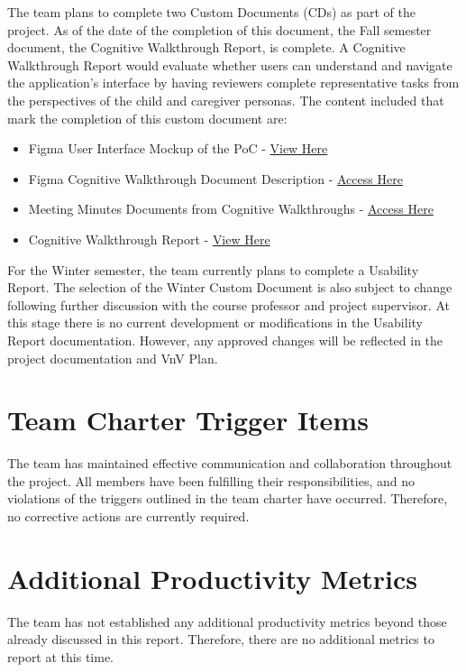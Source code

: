 \documentclass[10pt, titlepage]{article}
\begin{document}
The team plans to complete two Custom Documents (CDs) as part of the \progname{} project. As of the date of the completion 
of this document, the Fall semester document, the Cognitive Walkthrough Report, is complete. A Cognitive Walkthrough Report 
would evaluate whether users can understand and navigate the application's interface by having reviewers complete representative 
tasks from the perspectives of the child and caregiver personas. The content included that mark the completion of this custom 
document are:
\begin{itemize}
    \item Figma User Interface Mockup of the PoC - \href{https://www.figma.com/proto/IBdPBjcaoQjUY02BwWSvpv/EyeCanDo-Cognitive-Walkthrough?node-id=7-2&t=RJp70Vsrg4hKMli7-1&scaling=scale-down&content-scaling=fixed&page-id=0%3A1&starting-point-node-id=7%3A2}{View Here}
    \item Figma Cognitive Walkthrough Document Description - \href{https://github.com/team-hindsight/ophthamology-game/blob/main/docs/CDs/CognitiveWalkthrough/Figma/Figma.md}{Access Here}
    \item Meeting Minutes Documents from Cognitive Walkthroughs - \href{https://github.com/team-hindsight/ophthamology-game/tree/main/docs/CDs/CognitiveWalkthrough/MeetingNotes}{Access Here}
    \item Cognitive Walkthrough Report - \href{https://team-hindsight.github.io/ophthamology-game/CDs/CognitiveWalkthrough/CognitiveWalkthrough.pdf}{View Here}
\end{itemize}

For the Winter semester, the team currently plans to complete a Usability Report. The selection of the Winter 
Custom Document is also subject to change following further discussion with the course professor and project supervisor. 
At this stage there is no current development or modifications in the Usability Report documentation. However, any approved 
changes will be reflected in the project documentation and VnV Plan.

\section{Team Charter Trigger Items}

The team has maintained effective communication and
collaboration throughout the project. All members have
been fulfilling their responsibilities, and no violations
of the triggers outlined in the team charter have occurred.
Therefore, no corrective actions are currently required.

\section{Additional Productivity Metrics}

The team has not established any additional productivity
metrics beyond those already discussed in this report.
Therefore, there are no additional metrics to report
at this time.
\end{document}
